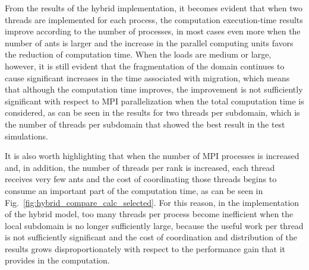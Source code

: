 






From the results of the hybrid implementation, it becomes evident that when two threads are implemented for each process, the computation execution-time results improve according to the number of processes, in most cases even more when the number of ants is larger and the increase in the parallel computing units favors the reduction of computation time. When the loads are medium or large, however, it is still evident that the fragmentation of the domain continues to cause significant increases in the time associated with migration, which means that although the computation time improves, the improvement is not sufficiently significant with respect to MPI parallelization when the total computation time is considered, as can be seen in the results for two threads per subdomain, which is the number of threads per subdomain that showed the best result in the test simulations.

It is also worth highlighting that when the number of MPI processes is increased and, in addition, the number of threads per rank is increased, each thread receives very few ants and the cost of coordinating those threads begins to consume an important part of the computation time, as can be seen in Fig.~\ref{fig:hybrid_compare_calc_selected}. For this reason, in the implementation of the hybrid model, too many threads per process become inefficient when the local subdomain is no longer sufficiently large, because the useful work per thread is not sufficiently significant and the cost of coordination and distribution of the results grows disproportionately with respect to the performance gain that it provides in the computation.
